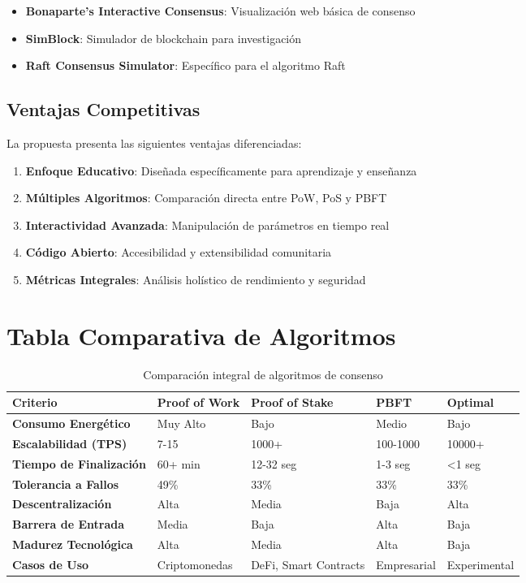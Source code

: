 \begin{itemize}
    \item \textbf{Bonaparte's Interactive Consensus}: Visualización web básica de consenso
    \item \textbf{SimBlock}: Simulador de blockchain para investigación
    \item \textbf{Raft Consensus Simulator}: Específico para el algoritmo Raft
\end{itemize}

\subsection{Ventajas Competitivas}

La propuesta presenta las siguientes ventajas diferenciadas:

\begin{enumerate}
    \item \textbf{Enfoque Educativo}: Diseñada específicamente para aprendizaje y enseñanza
    \item \textbf{Múltiples Algoritmos}: Comparación directa entre PoW, PoS y PBFT
    \item \textbf{Interactividad Avanzada}: Manipulación de parámetros en tiempo real
    \item \textbf{Código Abierto}: Accesibilidad y extensibilidad comunitaria
    \item \textbf{Métricas Integrales}: Análisis holístico de rendimiento y seguridad
\end{enumerate}

\section{Tabla Comparativa de Algoritmos}

\begin{table}[h]
\centering
\scriptsize
\begin{tabular}{|p{2.5cm}|p{3cm}|p{3cm}|p{3cm}|p{2cm}|}
\hline
\textbf{Criterio} & \textbf{Proof of Work} & \textbf{Proof of Stake} & \textbf{PBFT} & \textbf{Optimal} \\
\hline
\textbf{Consumo Energético} & Muy Alto & Bajo & Medio & Bajo \\
\hline
\textbf{Escalabilidad (TPS)} & 7-15 & 1000+ & 100-1000 & 10000+ \\
\hline
\textbf{Tiempo de Finalización} & 60+ min & 12-32 seg & 1-3 seg & <1 seg \\
\hline
\textbf{Tolerancia a Fallos} & 49\% & 33\% & 33\% & 33\% \\
\hline
\textbf{Descentralización} & Alta & Media & Baja & Alta \\
\hline
\textbf{Barrera de Entrada} & Media & Baja & Alta & Baja \\
\hline
\textbf{Madurez Tecnológica} & Alta & Media & Alta & Baja \\
\hline
\textbf{Casos de Uso} & Criptomonedas & DeFi, Smart Contracts & Empresarial & Experimental \\
\hline
\end{tabular}
\caption{Comparación integral de algoritmos de consenso}
\label{tab:consensus-comparison}
\end{table}

